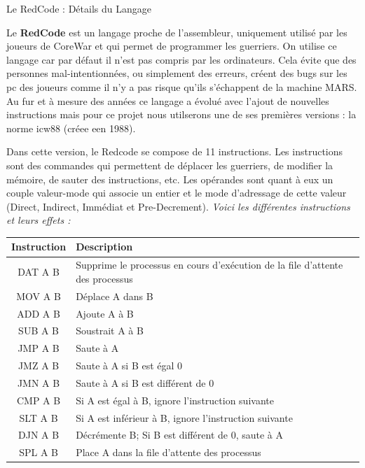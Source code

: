 \documentclass[a4paper, 10pt]{article}
\begin{document}
    \begin{section}{Le RedCode : Détails du Langage}\label{sec:redcode}
        \par
            Le \textbf{RedCode} est un langage proche de l'assembleur, uniquement utilisé par les joueurs de CoreWar et qui permet de programmer les guerriers. On utilise ce langage car par défaut il n'est pas compris par les ordinateurs. Cela évite que des personnes mal-intentionnées, ou simplement des erreurs, créent des bugs sur les pc des joueurs comme il n'y a pas risque qu'ils s'échappent de la machine MARS. Au fur et à mesure des années ce langage a évolué avec l'ajout de nouvelles instructions mais pour ce projet nous utilserons une de ses premières versions : la norme icw88 (créee een 1988). 
            
            Dans cette version, le Redcode se compose de 11 instructions. Les instructions sont des commandes qui permettent de déplacer les guerriers, de modifier la mémoire, de sauter des instructions, etc. Les opérandes sont quant à eux un couple valeur-mode qui associe un entier et le mode d'adressage de cette valeur (Direct, Indirect, Immédiat et Pre-Decrement).
            \bigskip \newline
                \textit{Voici les différentes instructions et leurs effets :}
            \bigskip

            \begin{tabular}{|c|p{8cm}|}
                \hline
                    \textbf{Instruction} & \textbf{Description} \\
                \hline
                    DAT A B & Supprime le processus en cours d'exécution de la file d'attente des processus \\
                \hline
                    MOV A B & Déplace A dans B \\
                \hline
                    ADD A B & Ajoute A à B \\
                \hline
                    SUB A B & Soustrait A à B \\
                \hline
                    JMP A B & Saute à A \\
                \hline
                    JMZ A B & Saute à A si B est égal 0\\
                \hline
                    JMN A B & Saute à A si B est différent de 0 \\
                \hline
                    CMP A B & Si A est égal à B, ignore l'instruction suivante\\
                \hline
                    SLT A B & Si A est inférieur à B, ignore l'instruction suivante\\
                \hline
                    DJN A B & Décrémente B; Si B est différent de 0, saute à A \\
                \hline
                    SPL A B & Place A dans la file d'attente des processus \\
                \hline
        \end{tabular}


\end{section}
\end{document}
